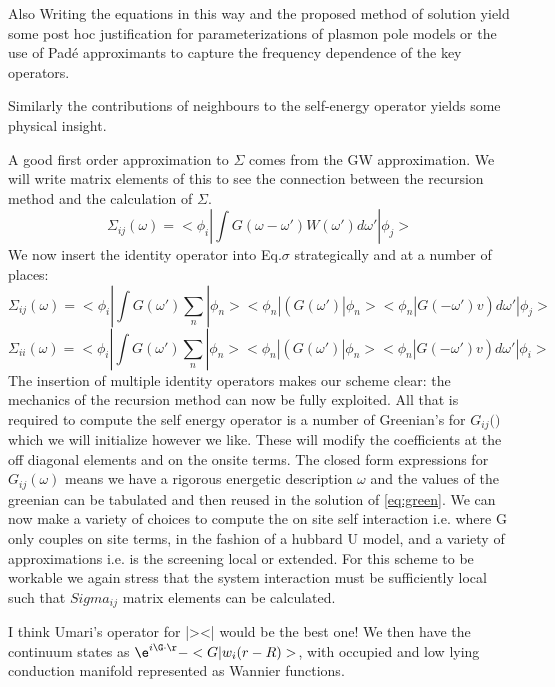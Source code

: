Also Writing the equations in this way and the proposed method of solution
yield some post hoc justification for parameterizations of plasmon
pole models or the use of Pad\'e approximants to capture the frequency dependence
of the key operators.

Similarly the contributions of neighbours to the self-energy 
operator yields some physical insight.

A good first order approximation to $\Sigma$ comes from the GW approximation.
We will write matrix elements of this to see the connection between the
recursion method and the calculation of $\Sigma$. 
%
\begin{equation}
\label{eq:sigma}
\Sigma_{ij}(\omega) = <\phi_{i}|\int G(\omega-\omega')W(\omega')d\omega'|\phi_{j}>
\end{equation}
%
	We now insert the identity operator into Eq.$\sigma$ strategically and at 
a number of places:
%
\begin{equation}
\label{eq:sigma}
\Sigma_{ij}(\omega) = <\phi_{i}|\int G(\omega')\sum_{n}|\phi_{n}><\phi_{n}|(G(\omega')|\phi_{n}><\phi_{n}|G(-\omega')v)d\omega'|\phi_{j}>
\end{equation}
%
\begin{equation}
\label{eq:sigma_onsite}%
\Sigma_{ii}(\omega) = <\phi_{i}|\int G(\omega')\sum_{n}|\phi_{n}><\phi_{n}|(G(\omega')|\phi_{n}><\phi_{n}|G(-\omega')v)d\omega'|\phi_{i}>
\end{equation}
%
	The insertion of multiple identity operators
makes our scheme clear: the mechanics of the recursion method 
can now be fully exploited. All that is required to compute the self energy 
operator is a number of Greenian's for $G_{ij}($\omega$)$ which we will
initialize however we like. These will modify the coefficients at the
off diagonal elements and on the onsite terms. The closed form
expressions for $G_{ij}(\omega)$ means we have a rigorous 
energetic description $\omega$ and the values of the greenian 
can be tabulated and then reused in the solution of \ref{eq:green}.
We can now make a variety of choices to compute the on site self interaction
i.e. where G only couples on site terms, in the fashion of a hubbard U model,
and a variety of approximations i.e. is the screening local or extended.
For this scheme to be workable we again stress that the system interaction
must be sufficiently local such that $Sigma_{ij}$ matrix elements can be
calculated.

I think Umari's operator for |\phi><\phi| would be the best one!
We then have the continuum states as $\e^{i\G\cdot\r}-<G|w_{i}(r-R)>$,
with occupied and low lying conduction manifold represented as Wannier 
functions.

